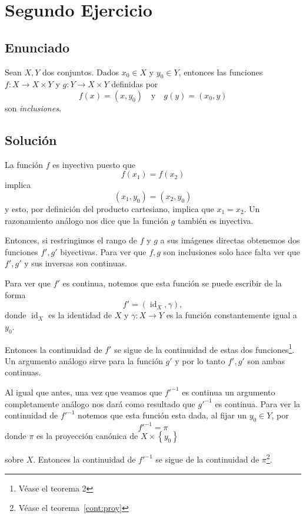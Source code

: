 \documentclass[mid,fleqn,final,oneside]{tareas}
\DeclareMathOperator{\id}{id}
\begin{document}
\chapter{Segundo Ejercicio}
\reversemarginpar{}
\vspace{-.1em}
\section*{Enunciado\footnotemark}
Sean $X,Y$ dos conjuntos. Dados $x_0\in X$ y $y_0\in Y$, entonces las funciones $f:X\to X\times Y$ y 
$g: Y\to X\times Y$ definidas por
\[
	f(x)=(x,y_0)\quad\text{y}\quad g(y)=(x_0,y)
\]
son \emph{inclusiones}.

\section*{Solución}

La función $f$ es inyectiva puesto que
\[
f(x_1)=f(x_2)
\]
implica
\[
(x_1,y_0)=(x_2,y_0)
\]
y esto, por definición del producto cartesiano, implica
que $x_1=x_2$. Un razonamiento análogo nos dice que la
función $g$ también es inyectiva.

Entonces, si restringimos el rango de $f$ y $g$ a sus
imágenes directas obtenemos dos funciones $f',g'$
biyectivas. Para ver que $f,g$ son inclusiones solo
hace falta ver que $f',g'$ y sus inversas son
continuas.

Para ver que $f'$ es continua, notemos que esta función
se puede escribir de la forma
\[
f'=(\id_X,\gamma),
\]
donde $\id_X$ es la identidad de $X$ y $\gamma:X\to Y$ 
es la función constantemente igual a $y_0$.

Entonces la continuidad de $f'$ se sigue de la
continuidad de estas dos funciones\footnote{Véase el teorema 2\cite{cont:funccoord}}. Un argumento
análogo sirve para la función $g'$ y por lo tanto
$f',g'$ son ambas continuas.

Al igual que antes, una vez que veamos que $f'^{-1}$ es
continua un argumento completamente análogo nos dará
como resultado que $g'^{-1}$ es continua. Para ver la
continuidad de $f'^{-1}$ notemos que esta función esta
dada, al fijar un $y_0\in Y$, por
\[
f'^{-1}=\pi	
\]
donde $\pi$ es la proyección canónica de $X\times\left\{ y_0 \right\}$

sobre $X$. Entonces la continuidad de $f'^{-1}$ se
sigue de la continuidad de $\pi$\footnote{Véase el teorema~\ref{cont:proy}}.
\end{document}
